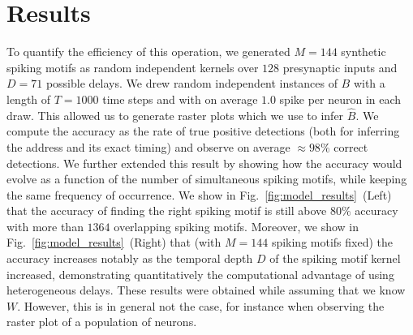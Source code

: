 \documentclass[runningheads]{llncs}
\newcommand{\fig}[1]{Fig.~\ref{fig:#1}}%
\begin{document}
\section{Results}
%
To quantify the efficiency of this operation, we generated $M=144$ synthetic spiking motifs as random independent kernels over $128$ presynaptic inputs and $D=71$ possible delays. We drew random independent instances of $B$ with a length of $T=1000$ time steps and with on average $1.0$ spike per neuron in each draw. This allowed us to generate raster plots which we use to infer $\hat{B}$. We compute the accuracy as the rate of true positive detections (both for inferring the address and its exact timing) and observe on average $\approx 98\%$ correct detections. We further extended this result by showing how the accuracy would evolve as a function of the number of simultaneous spiking motifs, while keeping the same frequency of occurrence. We show in \fig{model_results}~(Left) that the accuracy of finding the right spiking motif is still above $80\%$ accuracy with more than $1364$ overlapping spiking motifs. Moreover, we show in \fig{model_results}~(Right) that (with $M=144$ spiking motifs fixed) the accuracy increases notably as the temporal depth $D$ of the spiking motif kernel increased, demonstrating quantitatively the computational advantage of using heterogeneous delays. These results were obtained while assuming that we know $W$. However, this is in general not the case, for instance when observing the raster plot of a population of neurons. %
\end{document}
